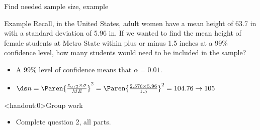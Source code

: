 \documentclass[xcolor=table, handout]{beamer}
\begin{document}
\begin{frame}{Find needed sample size, example}
\begin{exampleblock}{Example}
\large
Recall, in the United States, adult women have a mean height of 63.7 in with a standard deviation of 5.96 in. If we wanted to find the mean height of female students at Metro State within plus or minus 1.5 inches at a 99\% confidence level, how many students would need to be included in the sample?

\begin{itemize}
\pause\item A 99\% level of confidence means that $\alpha = 0.01$.
\pause\item $\ds n = \Paren{\frac{z_{\alpha/2} \times \sigma}{ME}}^2= \Paren{\frac{2.576 \times 5.96}{1.5}}^2 = 104.76 \to 105$
\end{itemize}
\end{exampleblock}
\end{frame}

\begin{frame}<handout:0>{Group work}
\begin{block}{}
\large
\begin{itemize}
\item Complete question 2, all parts.
\end{itemize}
\end{block}
\end{frame}
\end{document}
